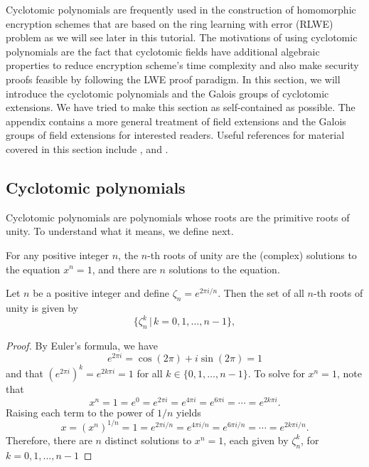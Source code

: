 \documentclass[../main.tex]{subfiles}
\begin{document}
\label{sec:cyclotomic}

Cyclotomic polynomials are frequently used in the construction of homomorphic encryption schemes that are based on the ring learning with error (RLWE) problem  as we will see later in this tutorial. The motivations of using cyclotomic polynomials are the fact that cyclotomic fields have additional algebraic properties to reduce encryption scheme's time complexity and also make security proofs feasible by following the LWE proof paradigm. 
In this section, we will introduce the cyclotomic polynomials and the Galois groups of cyclotomic extensions. 
We have tried to make this section as self-contained as possible.
The appendix contains a more general treatment of field extensions and the Galois groups of field extensions for interested readers.
Useful references for material covered in this section include \cite{mukherjee2016cyclotomic}, \cite{conradcyclotomic} and \cite{porter15cyclotomic}. 


\subsection{Cyclotomic polynomials}
Cyclotomic polynomials are polynomials whose roots are the primitive roots of unity. To understand what it means, we define next. 

\begin{definition}
For any positive integer $n$, the $n$-th roots of unity\reversemarginpar{} are the (complex) solutions to the equation $x^n = 1$, and there are $n$ solutions to the equation. 
% 
\end{definition}

\begin{theorem}\label{thm:roots of unity}
Let $n$ be a positive integer and define $\zeta_n = e^{2\pi i/n}$.
Then the set of all $n$-th roots of unity is given by 
\begin{equation}
    \{ \zeta_n^k \,|\, k = 0,1,\ldots, n-1 \},
\end{equation}
\end{theorem}
\begin{proof}
By Euler's formula, we have
\[ e^{2\pi i} = \cos(2\pi) + i \sin(2\pi) = 1 \]
and that $(e^{2\pi i})^k = e^{2k\pi i} = 1$ for all $k \in \{0,1,\ldots, n-1\}$.
To solve for $x^n = 1$, note that
\[ x^n = 1 = e^0 = e^{2\pi i} = e^{4\pi i} = e^{6\pi i} = \cdots = e^{2k\pi i}. \]
Raising each term to the power of $1/n$ yields
\[ x = (x^n)^{1/n} = 1 = e^{2\pi i/n} = e^{4\pi i/n} = e^{6\pi i/n} = \cdots = e^{2k\pi i/n}. \]
Therefore, there are $n$ distinct solutions to $x^n = 1$, each given by $\zeta_n^k$, for $k=0,1,\ldots,n-1$
\end{proof}
\end{document}
